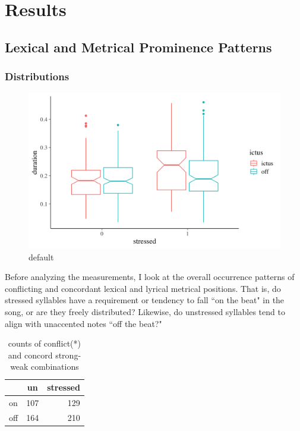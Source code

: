 \chapter{Results}
%

\section{Lexical and Metrical Prominence Patterns}
\subsection{Distributions}

\begin{figure}[htbp]
\begin{center}
\includegraphics[width=\textwidth]{figures/strictus_box.png}
\caption{default}
\label{strickbox}
\end{center}
\end{figure}


Before analyzing the measurements, I look at the overall occurrence patterns of conflicting and concordant lexical and lyrical metrical positions. That is, do stressed syllables have a requirement or tendency to fall ``on the beat" in the song, or are they freely distributed? Likewise, do unstressed syllables tend to align with unaccented notes ``off the beat?" 


\begin{table}[ht]
\centering
\begin{tabular}{lcr}
\hline
 & un &   stressed \\
\hline
on  &   107 & 129 \\
off     &  164 & 210 \\
\hline
\end{tabular}
\label{contin}
\caption{counts of conflict(*) and concord strong-weak combinations}
\end{table}

